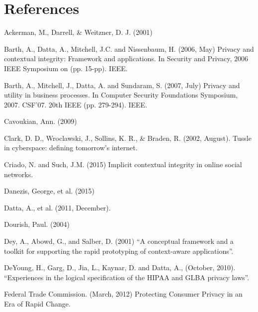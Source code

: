 \documentclass[../thesis.tex]{subfiles}
\begin{document}
\section{References}

Ackerman, M., Darrell, \& Weitzner, D. J. (2001) \cite{ackerman2001privacy}


Barth, A., Datta, A., Mitchell, J.C. and Nissenbaum, H. (2006, May)
Privacy and contextual integrity: Framework and applications. In
Security and Privacy, 2006 IEEE Symposium on (pp. 15-pp). IEEE.
\cite{barth2006privacy}

\bigskip

Barth, A., Mitchell, J., Datta, A. and Sundaram, S. (2007, July) Privacy
and utility in business processes. In Computer Security Foundations
Symposium, 2007. CSF'07. 20th IEEE (pp. 279-294).
IEEE. \cite{barth2007privacy}


\bigskip

Cavoukian, Ann. (2009) \cite{cavoukian2009whole}

\bigskip

Clark, D. D.,
Wroclawski, J., Sollins, K. R., \& Braden, R. (2002, August). Tussle in
cyberspace: defining tomorrow's internet.
\cite{clark2002tussle}

\bigskip

Criado, N. and Such, J.M. (2015) Implicit contextual integrity in online
social networks. \cite{criado2015implicit}

\bigskip

Danezis, George, et
al. (2015) \cite{danezis2015privacy}

\bigskip

Datta, A., et al. (2011, December). 
\cite{datta2011understanding}


\bigskip

Dourish, Paul. (2004)  \cite{dourish2004we}


\bigskip

Dey, A., Abowd, G., and Salber, D. (2001) ``A
conceptual framework and a toolkit for supporting the rapid prototyping
of context-aware applications''. 
\cite{dey2001conceptual}


\bigskip

DeYoung, H., Garg, D.,
Jia, L., Kaynar, D. and Datta, A., (October, 2010).
``Experiences in the logical specification of the
HIPAA and GLBA privacy laws''. 
\cite{deyoung2010experiences}

\bigskip

Federal Trade Commission. (March, 2012) Protecting Consumer Privacy in
an Era of Rapid Change. \cite{federalprotecting}
\end{document}
